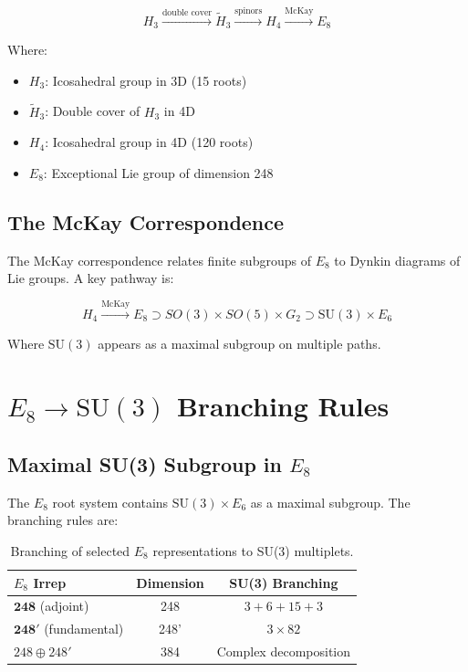 \documentclass{article}
\begin{document}
\begin{equation}
  H_3 \xrightarrow{\text{double cover}} \tilde{H}_3 \xrightarrow{\text{spinors}} H_4 \xrightarrow{\text{McKay}} E_8
  \label{eq:coxeter-chain}
\end{equation}

Where:
\begin{itemize}
  \item $H_3$: Icosahedral group in 3D (15 roots)
  \item $\tilde{H}_3$: Double cover of $H_3$ in 4D
  \item $H_4$: Icosahedral group in 4D (120 roots)
  \item $E_8$: Exceptional Lie group of dimension 248
\end{itemize}

\subsection{The McKay Correspondence}

The McKay correspondence relates finite subgroups of $E_8$ to Dynkin diagrams of Lie groups. A key pathway is:

\begin{equation}
  H_4 \xrightarrow{\text{McKay}} E_8 \supset SO(3) \times SO(5) \times G_2 \supset \text{SU}(3) \times E_6
  \label{eq:mckay}
\end{equation}

Where $\text{SU}(3)$ appears as a maximal subgroup on multiple paths.

\section{$E_8 \to \text{SU}(3)$ Branching Rules}

\subsection{Maximal SU(3) Subgroup in $E_8$}

The $E_8$ root system contains $\text{SU}(3) \times E_6$ as a maximal subgroup. The branching rules are:

\begin{table}[h]
\centering
\caption{Branching of selected $E_8$ representations to SU(3) multiplets.}
\label{tab:e8-su3-branching}
\renewcommand{\arraystretch}{1.2}
\begin{tabular}{lcc}
\toprule
$E_8$ Irrep & Dimension & SU(3) Branching \\
\midrule
$\mathbf{248}$ (adjoint) & 248 & $3 + 6 + 15 + 3$ \\
$\mathbf{248}'$ (fundamental) & 248' & $3 \times 82$ \\
$248 \oplus 248'$ & 384 & Complex decomposition \\
\bottomrule
\end{tabular}
\end{table}
\end{document}
